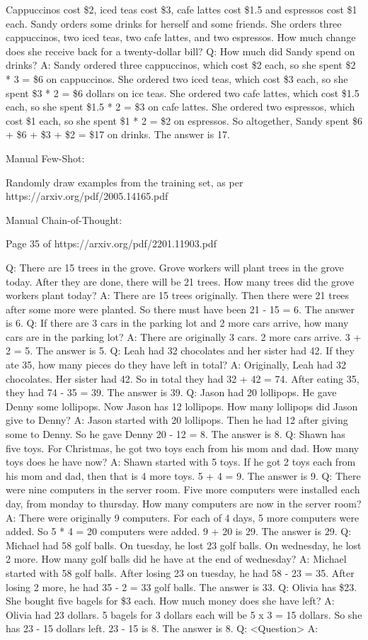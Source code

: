 \documentclass[11pt]{article}
\begin{document}
Cappuccinos cost \$2, iced teas cost \$3, cafe lattes cost \$1.5 and espressos cost \$1 each.
Sandy orders some drinks for herself and some friends. She orders three cappuccinos, two iced teas,
two cafe lattes, and two espressos. How much change does she receive back for a twenty-dollar
bill?
Q: How much did Sandy spend on drinks?
A: Sandy ordered three cappuccinos, which cost \$2 each, so she spent \$2 * 3 = \$6 on cappuccinos.
She ordered two iced teas, which cost \$3 each, so she spent \$3 * 2 = \$6 dollars on ice teas. She
ordered two cafe lattes, which cost \$1.5 each, so she spent \$1.5 * 2 = \$3 on cafe lattes. She ordered
two espressos, which cost \$1 each, so she spent \$1 * 2 = \$2 on espressos. So altogether, Sandy
spent \$6 + \$6 + \$3 + \$2 = \$17 on drinks. The answer is 17.

Manual Few-Shot:

Randomly draw examples from the training set, as per https://arxiv.org/pdf/2005.14165.pdf

Manual Chain-of-Thought:

Page 35 of https://arxiv.org/pdf/2201.11903.pdf

Q: There are 15 trees in the grove. Grove workers will plant trees in the grove today. After they are done, there
will be 21 trees. How many trees did the grove workers plant today?
A: There are 15 trees originally. Then there were 21 trees after some more were planted. So there must have
been 21 - 15 = 6. The answer is 6.
Q: If there are 3 cars in the parking lot and 2 more cars arrive, how many cars are in the parking lot?
A: There are originally 3 cars. 2 more cars arrive. 3 + 2 = 5. The answer is 5.
Q: Leah had 32 chocolates and her sister had 42. If they ate 35, how many pieces do they have left in total?
A: Originally, Leah had 32 chocolates. Her sister had 42. So in total they had 32 + 42 = 74. After eating 35, they
had 74 - 35 = 39. The answer is 39.
Q: Jason had 20 lollipops. He gave Denny some lollipops. Now Jason has 12 lollipops. How many lollipops did
Jason give to Denny?
A: Jason started with 20 lollipops. Then he had 12 after giving some to Denny. So he gave Denny 20 - 12 = 8.
The answer is 8.
Q: Shawn has five toys. For Christmas, he got two toys each from his mom and dad. How many toys does he
have now?
A: Shawn started with 5 toys. If he got 2 toys each from his mom and dad, then that is 4 more toys. 5 + 4 = 9.
The answer is 9.
Q: There were nine computers in the server room. Five more computers were installed each day, from monday
to thursday. How many computers are now in the server room?
A: There were originally 9 computers. For each of 4 days, 5 more computers were added. So 5 * 4 = 20
computers were added. 9 + 20 is 29. The answer is 29.
Q: Michael had 58 golf balls. On tuesday, he lost 23 golf balls. On wednesday, he lost 2 more. How many golf
balls did he have at the end of wednesday?
A: Michael started with 58 golf balls. After losing 23 on tuesday, he had 58 - 23 = 35. After losing 2 more, he
had 35 - 2 = 33 golf balls. The answer is 33.
Q: Olivia has \$23. She bought five bagels for \$3 each. How much money does she have left?
A: Olivia had 23 dollars. 5 bagels for 3 dollars each will be 5 x 3 = 15 dollars. So she has 23 - 15 dollars left. 23
- 15 is 8. The answer is 8.
Q: <Question>
A:
\end{document}
